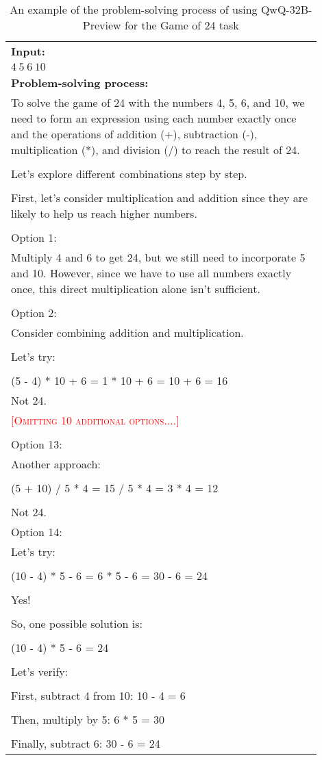 \begin{table*}[ht]
\small
\centering
\caption{An example of the problem-solving process of using QwQ-32B-Preview for the Game of 24 task}
\begin{tabular}{p{0.9\linewidth}} \toprule
\textbf{Input: }\\
$4\ 5\ 6\ 10$\\
\midrule
\textbf{Problem-solving process:}\\
To solve the game of 24 with the numbers 4, 5, 6, and 10, we need to form an expression using each number exactly once and the operations of addition (+), subtraction (-), multiplication (*), and division (/) to reach the result of 24.\\
\\
Let's explore different combinations step by step.\\
\\
First, let's consider multiplication and addition since they are likely to help us reach higher numbers.\\
\\
Option 1:\\
Multiply 4 and 6 to get 24, but we still need to incorporate 5 and 10. However, since we have to use all numbers exactly once, this direct multiplication alone isn't sufficient.\\
\\
Option 2:\\
Consider combining addition and multiplication.\\
\\
Let's try:\\
\\
(5 - 4) * 10 + 6 = 1 * 10 + 6 = 10 + 6 = 16
\\
Not 24.\\
\textcolor{red}{\textsc{[Omitting 10 additional options....]}}\\
\\
Option 13:\\
Another approach:\\
\\
(5 + 10) / 5 * 4 = 15 / 5 * 4 = 3 * 4 = 12\\
\\
Not 24.\\
Option 14:\\
Let's try:\\
\\
(10 - 4) * 5 - 6 = 6 * 5 - 6 = 30 - 6 = 24\\
\\
Yes!\\
\\
So, one possible solution is:\\
\\
(10 - 4) * 5 - 6 = 24\\
\\
Let's verify:\\
\\
First, subtract 4 from 10: 10 - 4 = 6\\
\\
Then, multiply by 5: 6 * 5 = 30\\
\\
Finally, subtract 6: 30 - 6 = 24\\


\end{tabular}
\end{table*}
